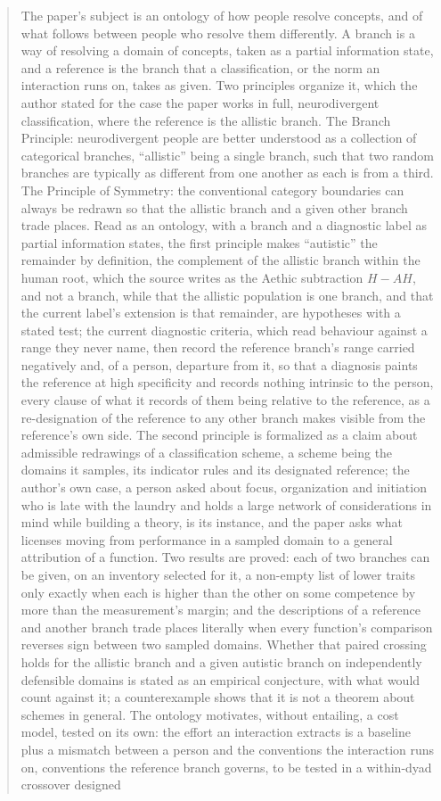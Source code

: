 \begin{abstract}
The paper's subject is an ontology of how people resolve concepts, and of what follows between people who resolve them differently. A branch is a way of resolving a domain of concepts, taken as a partial information state, and a reference is the branch that a classification, or the norm an interaction runs on, takes as given. Two principles organize it, which the author stated for the case the paper works in full, neurodivergent classification, where the reference is the allistic branch. The Branch Principle: neurodivergent people are better understood as a collection of categorical branches, ``allistic'' being a single branch, such that two random branches are typically as different from one another as each is from a third. The Principle of Symmetry: the conventional category boundaries can always be redrawn so that the allistic branch and a given other branch trade places. Read as an ontology, with a branch and a diagnostic label as partial information states, the first principle makes ``autistic'' the remainder by definition, the complement of the allistic branch within the human root, which the source writes as the Aethic subtraction $H - AH$, and not a branch, while that the allistic population is one branch, and that the current label's extension is that remainder, are hypotheses with a stated test; the current diagnostic criteria, which read behaviour against a range they never name, then record the reference branch's range carried negatively and, of a person, departure from it, so that a diagnosis paints the reference at high specificity and records nothing intrinsic to the person, every clause of what it records of them being relative to the reference, as a re-designation of the reference to any other branch makes visible from the reference's own side. The second principle is formalized as a claim about admissible redrawings of a classification scheme, a scheme being the domains it samples, its indicator rules and its designated reference; the author's own case, a person asked about focus, organization and initiation who is late with the laundry and holds a large network of considerations in mind while building a theory, is its instance, and the paper asks what licenses moving from performance in a sampled domain to a general attribution of a function. Two results are proved: each of two branches can be given, on an inventory selected for it, a non-empty list of lower traits only exactly when each is higher than the other on some competence by more than the measurement's margin; and the descriptions of a reference and another branch trade places literally when every function's comparison reverses sign between two sampled domains. Whether that paired crossing holds for the allistic branch and a given autistic branch on independently defensible domains is stated as an empirical conjecture, with what would count against it; a counterexample shows that it is not a theorem about schemes in general. The ontology motivates, without entailing, a cost model, tested on its own: the effort an interaction extracts is a baseline plus a mismatch between a person and the conventions the interaction runs on, conventions the reference branch governs, to be tested in a within-dyad crossover designed 
\end{abstract}
